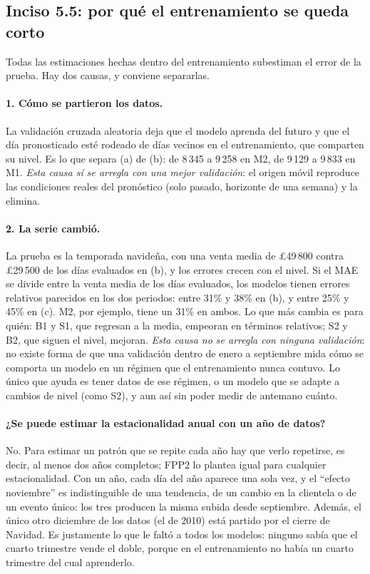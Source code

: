 \subsection{Inciso 5.5: por qué el entrenamiento se queda corto}

Todas las estimaciones hechas dentro del entrenamiento subestiman el error de
la prueba. Hay dos causas, y conviene separarlas.

\paragraph{1. Cómo se partieron los datos.} La validación cruzada aleatoria
deja que el modelo aprenda del futuro y que el día pronosticado esté rodeado
de días vecinos en el entrenamiento, que comparten su nivel. Es lo que separa
(a) de (b): de 8\,345 a 9\,258 en M2, de 9\,129 a 9\,833 en M1. \emph{Esta
causa sí se arregla con una mejor validación}: el origen móvil reproduce las
condiciones reales del pronóstico (solo pasado, horizonte de una semana) y la
elimina.

\paragraph{2. La serie cambió.} La prueba es la temporada navideña, con una
venta media de \pounds49\,800 contra \pounds29\,500 de los días evaluados en
(b), y los errores crecen con el nivel. Si el MAE se divide entre la venta
media de los días evaluados, los modelos tienen errores relativos parecidos
en los dos periodos: entre 31\% y 38\% en (b), y entre 25\% y 45\% en (c). M2,
por ejemplo, tiene un 31\% en ambos. Lo que más cambia es para quién: B1 y
S1, que regresan a la media, empeoran en términos relativos; S2 y B2, que
siguen el nivel, mejoran. \emph{Esta causa no se arregla con ninguna
validación}: no existe forma de que una validación dentro de enero a
septiembre mida cómo se comporta un modelo en un régimen que el entrenamiento
nunca contuvo. Lo único que ayuda es tener datos de ese régimen, o un modelo
que se adapte a cambios de nivel (como S2), y aun así sin poder medir de
antemano cuánto.

\paragraph{¿Se puede estimar la estacionalidad anual con un año de datos?}
No. Para estimar un patrón que se repite cada año hay que verlo repetirse,
es decir, al menos dos años completos; FPP2 lo plantea igual para cualquier
estacionalidad. Con un año, cada día del año aparece una sola vez, y el
``efecto noviembre'' es indistinguible de una tendencia, de un cambio en la
clientela o de un evento único: los tres producen la misma subida desde
septiembre. Además, el único otro diciembre de los datos (el de 2010) está
partido por el cierre de Navidad. Es justamente lo que le faltó a todos los
modelos: ninguno sabía que el cuarto trimestre vende el doble, porque en el
entrenamiento no había un cuarto trimestre del cual aprenderlo.
